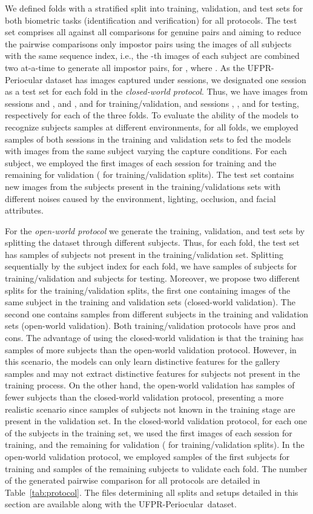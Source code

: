 \documentclass[journal]{IEEEtran}
\begin{document}
We defined  folds with a stratified split into training, validation, and test sets for both biometric tasks (identification and verification) for all protocols.
The test set comprises all against all comparisons for genuine pairs and aiming to reduce the pairwise comparisons only impostor pairs using the images of all subjects with the same sequence index, i.e., the -th images of each subject are combined two at-a-time to generate all impostor pairs, for , where .
As the UFPR-Periocular dataset has images captured under  sessions, we designated one session as a test set for each fold in the \textit{closed-world protocol}.
Thus, we have images from sessions  and ,  and ,  and  for training/validation, and sessions , , and  for testing, respectively for each of the three folds.  
To evaluate the ability of the models to recognize subjects samples at different environments, for all folds, we employed samples of both sessions in the training and validation sets to fed the models with images from the same subject varying the capture conditions.
For each subject, we employed the first  images of each session for training and the remaining  for validation ( for training/validation splits).
The test set contains new images from the subjects present in the training/validations sets with different noises caused by the environment, lighting, occlusion, and facial attributes.

For the \textit{open-world protocol} we generate the training, validation, and test sets by splitting the dataset through different subjects.
Thus, for each fold, the test set has samples of subjects not present in the training/validation set.
Splitting sequentially by the subject index for each fold, we have samples of  subjects for training/validation and  subjects for testing.
Moreover, we propose two different splits for the training/validation splits, the first one containing images of the same subject in the training and validation sets (closed-world validation).
The second one contains samples from different subjects in the training and validation sets (open-world validation).
Both training/validation protocols have pros and cons.
The advantage of using the closed-world validation is that the training has samples of more subjects than the open-world validation protocol.
However, in this scenario, the models can only learn distinctive features for the gallery samples and may not extract distinctive features for subjects not present in the training process.
On the other hand, the open-world validation has samples of fewer subjects than the closed-world validation protocol, presenting a more realistic scenario since samples of subjects not known in the training stage are present in the validation set.
In the closed-world validation protocol, for each one of the  subjects in the training set, we used the first  images of each session for training, and the remaining  for validation ( for training/validation splits).
In the open-world validation protocol, we employed samples of the first  subjects for training and samples of the remaining  subjects to validate each fold.
The number of the generated pairwise comparison for all protocols are detailed in Table~\ref{tab:protocol}.
The files determining all splits and setups detailed in this section are available along with the UFPR-Periocular~dataset. 
\end{document}
